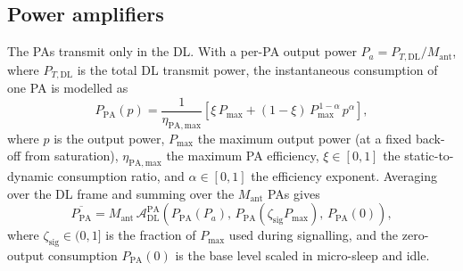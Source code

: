 \subsection{Power amplifiers}
\label{sec:pa}
The PAs transmit only in the DL. With a per-PA output power
$P_a=P_{T,\mathrm{DL}}/M_{\mathrm{ant}}$, where $P_{T,\mathrm{DL}}$ is the total
DL transmit power, the instantaneous consumption of one PA is modelled as
\begin{equation}
\label{eq:pa}
P_{\mathrm{PA}}(p) = \frac{1}{\eta_{\mathrm{PA,max}}}
\left[\xi\,P_{\max} + (1-\xi)\,P_{\max}^{\,1-\alpha}\,p^{\alpha}\right],
\end{equation}
where $p$ is the output power, $P_{\max}$ the maximum output power (at a fixed
back-off from saturation), $\eta_{\mathrm{PA,max}}$ the maximum PA efficiency,
$\xi\in[0,1]$ the static-to-dynamic consumption ratio, and $\alpha\in[0,1]$
the efficiency exponent. Averaging over the DL frame and summing over the
$M_{\mathrm{ant}}$ PAs gives
\begin{equation}
\label{eq:pa_avg}
\overline{P_{\mathrm{PA}}} = M_{\mathrm{ant}}\,
\mathcal{A}_{\mathrm{DL}}^{\mathrm{PA}}\!\left(
P_{\mathrm{PA}}(P_a),\,
P_{\mathrm{PA}}(\zeta_{\mathrm{sig}}P_{\max}),\,
P_{\mathrm{PA}}(0)\right),
\end{equation}
where $\zeta_{\mathrm{sig}}\in(0,1]$ is the fraction of $P_{\max}$ used during
signalling, and the zero-output consumption $P_{\mathrm{PA}}(0)$ is the base
level scaled in micro-sleep and idle.

